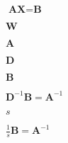 \documentclass{article}
\begin{document}
$\textbf{AX} = \textbf{B}$
\pagebreak

$\textbf{W}$
\pagebreak

$\textbf{A}$
\pagebreak

$\textbf{D}$
\pagebreak

$\textbf{B}$
\pagebreak

$\textbf{D}^{-1}\textbf{B} = \textbf{A}^{-1}$
\pagebreak

$s$
\pagebreak

$\frac{1}{s}\textbf{B} = \textbf{A}^{-1}$
\pagebreak
\end{document}

